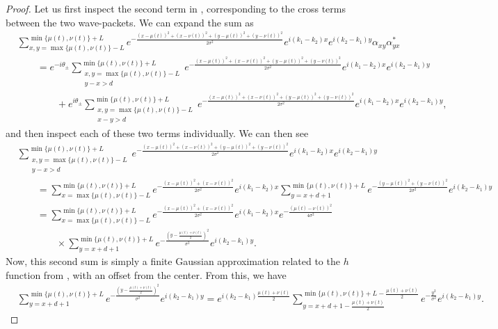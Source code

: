 \documentclass[../thesis-main/thesis-main]{subfiles}
\begin{document}
\begin{proof}
Let us first inspect the second term in , corresponding to the cross terms between the two wave-packets.  We can expand the sum as
\begin{align}
  &\sum_{x,y=\max\{\mu(t),\nu(t)\}-L}^{\min\{\mu(t),\nu(t)\}+L} e^{-\frac{(x-\mu(t))^2 + (x-\nu(t))^2 + (y-\mu(t))^2+(y-\nu(t))^2}{2\sigma^2}}e^{i (k_1-k_2) x}e^{i(k_2-k_1)y} \alpha_{xy}\alpha_{yx}^*\nonumber\\
  &\qquad = e^{-i\theta_{\pm}} \sum_{\substack{x,y=\max\{\mu(t),\nu(t)\}-L\\y-x > d}}^{\min\{\mu(t),\nu(t)\}+L}  e^{-\frac{(x-\mu(t))^2 + (x-\nu(t))^2 + (y-\mu(t))^2+(y-\nu(t))^2}{2\sigma^2}} e^{i (k_1 - k_2) x}e^{i (k_2 - k_1) y}\nonumber\\
  &\qquad\qquad + e^{i\theta_{\pm}} \sum_{\substack{x,y=\max\{\mu(t),\nu(t)\}-L\\x-y > d}}^{\min\{\mu(t),\nu(t)\}+L}  e^{-\frac{(x-\mu(t))^2 + (x-\nu(t))^2 + (y-\mu(t))^2+(y-\nu(t))^2}{2\sigma^2}} e^{i (k_1 - k_2) x}e^{i (k_2 - k_1) y},
\end{align}
and then inspect each of these two terms individually.  We can then see
\begin{align}
 &\sum_{\substack{x,y=\max\{\mu(t),\nu(t)\}-L\\y-x > d}}^{\min\{\mu(t),\nu(t)\}+L}  e^{-\frac{(x-\mu(t))^2 + (x-\nu(t))^2 + (y-\mu(t))^2+(y-\nu(t))^2}{2\sigma^2}} e^{i (k_1 - k_2) x}e^{i (k_2 - k_1) y}\nonumber\\
 &\qquad = \sum_{x=\max\{\mu(t),\nu(t)\}-L}^{\min\{\mu(t),\nu(t)\}+L} e^{-\frac{(x-\mu(t))^2 + (x-\nu(t))^2}{2\sigma^2}} e^{i (k_1 - k_2) x}\sum_{y = x+d+1}^{\min\{\mu(t),\nu(t)\}+L} e^{-\frac{(y-\mu(t))^2+(y-\nu(t))^2}{2\sigma^2}} e^{i (k_2 - k_1) y}\\
 &\qquad = \sum_{x=\max\{\mu(t),\nu(t)\}-L}^{\min\{\mu(t),\nu(t)\}+L} e^{-\frac{(x-\mu(t))^2 + (x-\nu(t))^2}{2\sigma^2}} e^{i (k_1 - k_2) x} e^{-\frac{(\mu(t)-\nu(t))^2}{4\sigma^2}} \nonumber\\
 &\qquad \qquad \times\sum_{y=x+d+1}^{\min\{\mu(t),\nu(t)\}+L} e^{-\frac{(y - \frac{\mu(t)+\nu(t)}{2})^2}{\sigma^2}} e^{i (k_2-k_1)y}.\label{eq:diagonal_term_overlap_single}
\end{align}
Now, this second sum is simply a finite Gaussian approximation related to the $h$ function from , with an offset from the center.  From this, we have
\begin{align}
  &\sum_{y=x+d+1}^{\min\{\mu(t),\nu(t)\}+L} e^{-\frac{(y - \frac{\mu(t)+\nu(t)}{2})^2}{\sigma^2}} e^{i (k_2-k_1)y}= e^{i (k_2-k_1) \frac{\mu(t)+\nu(t)}{2}}\sum_{y = x+d+1 - \frac{\mu(t)+\nu(t)}{2}}^{\min\{\mu(t),\nu(t)\}+L - \frac{\mu(t)+\nu(t)}{2}} e^{ -\frac{y^2}{\sigma^2}} e^{i (k_2-k_1)y}.

\end{align}
\end{proof}
\end{document}
